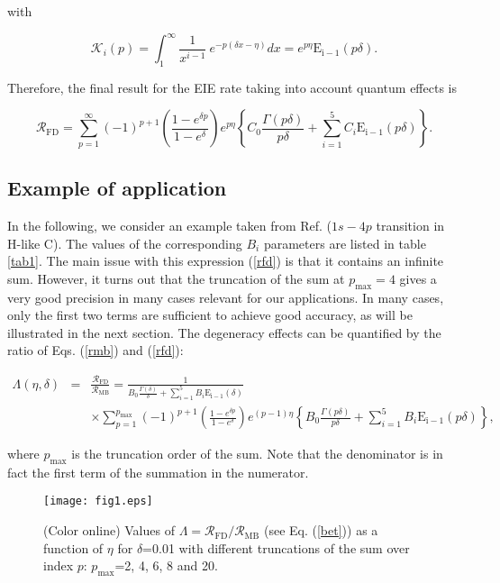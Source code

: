 \documentclass[a4paper,10pt]{article}
\begin{document}
\noindent with

\begin{equation*}
\mathcal{K}_i(p)=\int_1^{\infty}\frac{1}{x^{i-1}}~e^{-p(\delta x-\eta)}dx=e^{p\eta}\mathrm{E_{i-1}}(p\delta).
\end{equation*}

\noindent Therefore, the final result for the EIE rate taking into account quantum effects is

\begin{equation}\label{rfd}
\mathcal{R}_{\mathrm{FD}}=\sum_{p=1}^{\infty}(-1)^{p+1}\left(\frac{1-e^{\delta p}}{1-e^{\delta}}\right)e^{p\eta}\left\{C_0\frac{\Gamma(p\delta)}{p\delta}+\sum_{i=1}^5C_i\mathrm{E_{i-1}}(p\delta)\right\}.
\end{equation}

\subsection{Example of application}\label{subsec54}

In the following, we consider an example taken from Ref. \cite{SUNA06} ($1s-4p$ transition in H-like C). The values of the corresponding $B_i$ parameters are listed in table \ref{tab1}. The main issue with this expression (\ref{rfd}) is that it contains an infinite sum. However, it turns out that the truncation of the sum at $p_{\mathrm{max}}=4$ gives a very good precision in many cases relevant for our applications. In many cases, only the first two terms are sufficient to achieve good accuracy, as will be illustrated in the next section. The degeneracy effects can be quantified by the ratio of Eqs. (\ref{rmb}) and (\ref{rfd}):

\begin{eqnarray}\label{bet}
\Lambda(\eta,\delta)&=&\frac{\mathcal{R}_{\mathrm{FD}}}{\mathcal{R}_{\mathrm{MB}}}=\frac{1}{B_0\frac{\Gamma(\delta)}{\delta}+\sum_{i=1}^5B_i\mathrm{E_{i-1}}(\delta)}\nonumber\\
& &\times\sum_{p=1}^{p_{\mathrm{max}}}(-1)^{p+1}\left(\frac{1-e^{\delta p}}{1-e^{\delta}}\right)e^{(p-1)\eta}\left\{B_0\frac{\Gamma(p\delta)}{p\delta}+\sum_{i=1}^5B_i\mathrm{E_{i-1}}(p\delta)\right\},
\end{eqnarray}

\noindent where $p_{\mathrm{max}}$ is the truncation order of the sum. Note that the denominator is in fact the first term of the summation in the numerator. 

\begin{figure*}[ht]
\vspace{1cm}
\begin{center}
\texttt{[image: fig1.eps]}
\end{center}
\caption{(Color online) Values of $\Lambda=\mathcal{R}_{\mathrm{FD}}/\mathcal{R}_{\mathrm{MB}}$ (see Eq. (\ref{bet})) as a function of $\eta$ for $\delta$=0.01 with different truncations of the sum over index $p$: $p_{\mathrm{max}}$=2, 4, 6, 8 and 20.}\label{fig1}
\vspace{1cm}
\end{figure*}
\end{document}
